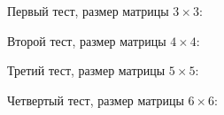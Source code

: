 \documentclass[14pt, titlepage,fleqn]{extarticle}
\begin{document}
	Первый тест, размер матрицы $3\times 3$:
	\begin{figure}[H]
	\end{figure}
	Второй тест, размер матрицы $4\times 4$:
	\begin{figure}[H]
	\end{figure}
	Третий тест, размер матрицы $5\times 5$:
	\begin{figure}[H]
	\end{figure}
	\newpage
	Четвертый тест, размер матрицы $6\times 6$:
	\begin{figure}[H]
	\end{figure}



	
\end{document}
